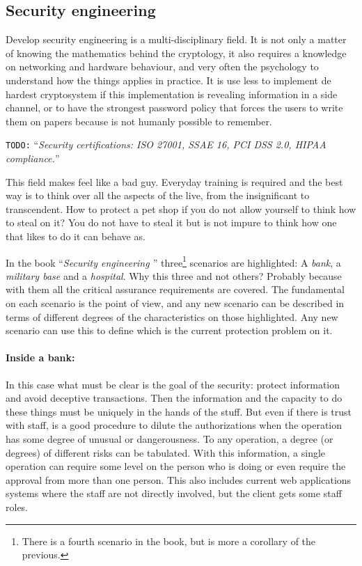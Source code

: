 \documentclass[10pt,a4paper,twoside]{llncs}
\newcommand{\todo}[1]{\texttt{\color{red}TODO:} ``\emph{#1}''}
\begin{document}
\subsection{Security engineering}\label{sec:SecurityEngineering}

Develop security engineering is a multi-disciplinary field. It is not only a matter of knowing the mathematics behind the cryptology, it also requires a knowledge on networking and hardware behaviour, and very often the psychology to understand how the things applies in practice. It is use less to implement de hardest cryptosystem if this implementation is revealing information in a side channel, or to have the strongest password policy that forces the users to write them on papers because is not humanly possible to remember.

\todo{Security certifications: \emph{ISO 27001}, \emph{SSAE 16}, \emph{PCI DSS 2.0}, \emph{HIPAA compliance}.}

This field makes feel like a bad guy. Everyday training is required and the best way is to think over all the aspects of the live, from the insignificant to transcendent. How to protect a pet shop if you do not allow yourself to think how to steal on it? You do not have to steal it but is not impure to think how one that likes to do it can behave as.

In the book ``\emph{Security engineering \cite{SecEngRossAnderson}}'' three\footnote{There is a fourth scenario in the book, but is more a corollary of the previous.} scenarios are highlighted: A \emph{bank}, a \emph{military base} and a \emph{hospital}. Why this three and not others? Probably because with them all the critical assurance requirements are covered. The fundamental on each scenario is the point of view, and any new scenario can be described in terms of different degrees of the characteristics on those highlighted. Any new scenario can use this to define which is the current protection problem on it.

\paragraph{Inside a bank:} In this case what must be clear is the goal of the security: protect information and avoid deceptive transactions. Then the information and the capacity to do these things must be uniquely in the hands of the stuff. But even if there is trust with staff, is a good procedure to dilute the authorizations when the operation has some degree of unusual or dangerousness. To any operation, a degree (or degrees) of different risks can be tabulated. With this information, a single operation can require some level on the person who is doing or even require the approval from more than one person. This also includes current web applications systems where the staff are not directly involved, but the client gets some staff roles.
\end{document}
